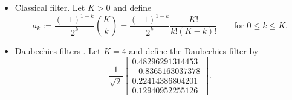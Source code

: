 \documentclass[smallextended]{svjour3}
\begin{document}
    \begin{itemize}
        \item Classical filter. 
        Let $K>0$ and define
        \begin{equation*}
            a_k:= 
            \frac{(-1)^{1-k}}{2^k} 
            {K\choose k} =
            \frac{(-1)^{1-k}}{2^k}
            \frac{K!}{k!(K-k)!}\qquad \mbox{for }  0\le k\le K.
        \end{equation*}
%
        \item 
            Daubechies filters 
            \citep[see][for original definition]{de}. 
            Let $K=4$ and define the Daubechies filter by
            \begin{equation*}
                \frac{1}{\sqrt{2}}
                \begin{bmatrix}
                    \num{0.48296291314453}
                    \\
                    \num{-0.8365163037378}
                    \\
                    \num{0.22414386804201}
                    \\
                    \num{0.12940952255126}
                \end{bmatrix}.
            \end{equation*}
    \end{itemize}
\end{document}
